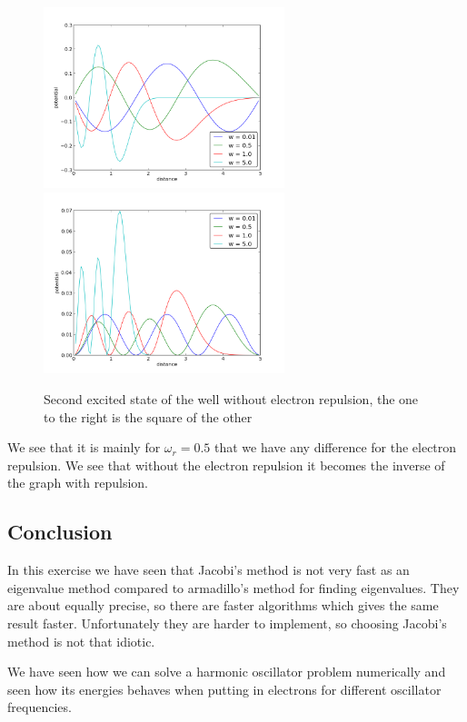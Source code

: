 \documentclass[a4wide,12pt]{article}
\begin{document}
\begin{figure}[p]
	\includegraphics[width=70mm]{potentialexc2}
	\includegraphics[width=70mm]{potentialexc2square}
		\caption{Second excited state of the well without electron repulsion, the one to the right is the square of the other}
\end{figure} 

We see that it is mainly for $\omega_r = 0.5$ that we have any difference for the electron repulsion. We see that without the electron repulsion it becomes the inverse of the graph with repulsion.


\subsection*{Conclusion}
In this exercise we have seen that Jacobi's method is not very fast as an eigenvalue method compared to armadillo's method for finding eigenvalues. They are about equally precise, so there are faster algorithms which gives the same result faster. Unfortunately
they are harder to implement, so choosing Jacobi's method is not that idiotic. 

We have seen how we can solve a harmonic oscillator problem numerically and seen how its energies behaves when putting in electrons for different oscillator frequencies. 
\end{document}
